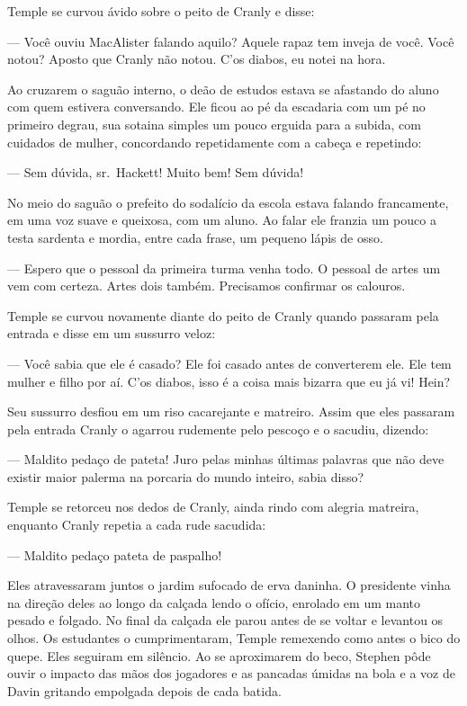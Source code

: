Temple se curvou ávido sobre o peito de Cranly e disse:

 --- Você ouviu MacAlister falando aquilo? Aquele rapaz tem inveja de você.
Você notou? Aposto que Cranly não notou. C’os diabos,
eu notei na hora.

Ao cruzarem o saguão interno, o deão de estudos estava se afastando do
aluno com quem estivera conversando. Ele ficou ao pé da escadaria com
um pé no primeiro degrau, sua sotaina simples um pouco erguida para a
subida, com cuidados de mulher, concordando repetidamente com a cabeça e
repetindo:

 --- Sem dúvida, sr.~Hackett! Muito bem! Sem dúvida!

No meio do saguão o prefeito do sodalício da escola estava falando
francamente, em uma voz suave e queixosa, com um aluno. Ao falar ele
franzia um pouco a testa sardenta e mordia, entre cada frase, um
pequeno lápis de osso.

 --- Espero que o pessoal da primeira turma venha todo. O pessoal de artes
 um vem com certeza. Artes dois também. Precisamos confirmar os        
calouros.

Temple se curvou novamente diante do peito de Cranly quando passaram
pela entrada e disse em um sussurro veloz:

 --- Você sabia que ele é casado? Ele foi casado antes de converterem ele.
Ele tem mulher e filho por aí. C’os diabos, isso é a
coisa mais bizarra que eu já vi! Hein?

Seu sussurro desfiou em um riso cacarejante e matreiro. Assim que eles
passaram pela entrada Cranly o agarrou rudemente pelo pescoço e o
sacudiu, dizendo:

 --- Maldito pedaço de pateta! Juro pelas minhas últimas palavras que não
deve existir maior palerma na porcaria do mundo inteiro, sabia disso?

Temple se retorceu nos dedos de Cranly, ainda rindo com alegria
matreira, enquanto Cranly repetia a cada rude sacudida:

 --- Maldito pedaço pateta de paspalho!

Eles atravessaram juntos o jardim sufocado de erva daninha. O
presidente vinha na direção deles ao longo da calçada lendo o
ofício, enrolado em um manto pesado e folgado. No final da calçada ele
parou antes de se voltar e levantou os olhos. Os estudantes o
cumprimentaram, Temple remexendo como antes o bico do quepe. Eles
seguiram em silêncio. Ao se aproximarem do beco, Stephen pôde ouvir o
impacto das mãos dos jogadores e as pancadas úmidas na bola e a voz de
Davin gritando empolgada depois de cada batida.

